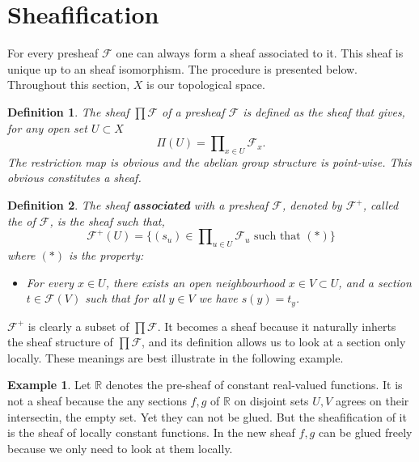 \documentclass{article}
\numberwithin{equation}{subsection} %
\newtheorem{defi}{Definition}[section]
\theoremstyle{definition}
\newtheorem{ex}{Example}[section]
\begin{document}

\section{Sheafification}
For every presheaf $ \mathcal{F}$ one can always form a sheaf associated to it. This sheaf is unique up to an sheaf isomorphism. The procedure is presented below. Throughout this section, $X$ is our topological space.

\begin{defi}
	The sheaf $\prod\mathcal{F}$ of a presheaf $\mathcal{F}$ is defined as the sheaf that gives, for any open set $U \subset X$ 
	$$
	\Pi(U) = \prod\nolimits_{x \in U} \mathcal{F}_x.
	$$
	The restriction map is obvious and the abelian group
	structure is point-wise. This obvious constitutes
	a sheaf.
\end{defi}

\begin{defi}
	The sheaf \textbf{associated} with a presheaf $ \mathcal{F}$, denoted
	by $\mathcal{F^+}$, called the  of $\mathcal{F}$, is the sheaf such that,
	$$
	\mathcal{F}^{+}(U)
	=
	\{
	(s_u) \in \prod\nolimits_{u \in U} \mathcal{F}_u
	\text{ such that }(*)
	\}
	$$
	where $(*)$ is the property:
	\begin{itemize}
		\item[$(*)$] For every $x \in U$, there exists an open neighbourhood
		$x \in V \subset U$, and a section $t \in \mathcal{F}(V)$
		such that for all $y \in V$ we have $s(y) = t_y$.
	\end{itemize}
\end{defi}

$\mathcal{F^+}$ is clearly a subset of $\mathcal{\prod F}$. It becomes a sheaf because it naturally inherts the sheaf structure of $\mathcal{\prod F}$, and its definition allows us to look at a section only locally. These meanings are best illustrate in the following example.
\begin{ex}
	Let $ \mathbb{R}$ denotes the pre-sheaf of constant real-valued functions. It is not a sheaf because the any sections $f,g$ of $ \mathbb{R}$ on disjoint sets $U,V$ agrees on their intersectin, the empty set. Yet they can not be glued. But the sheafification of it is the sheaf of locally constant functions. In the new sheaf $f,g$ can be glued freely because we only need to look at them locally.
\end{ex}
\end{document}

